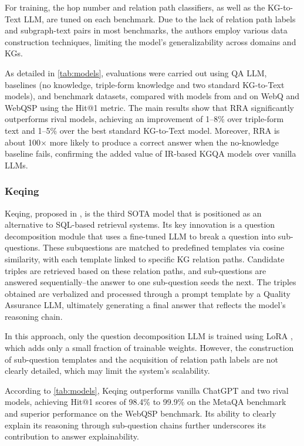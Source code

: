 \documentclass[pdflatex,sn-mathphys-num]{sn-jnl}%
\theoremstyle{thmstyleone}%
\theoremstyle{thmstyletwo}%
\theoremstyle{thmstylethree}%
\begin{document}
For training, the hop number and relation path classifiers, as well as the KG-to-Text LLM, are tuned on each benchmark. Due to the lack of relation path labels and subgraph-text pairs in most benchmarks, the authors employ various data construction techniques, limiting the model’s generalizability across domains and KGs.

As detailed in \autoref{tab:models}, evaluations were carried out using QA LLM, baselines (no knowledge, triple-form knowledge and two standard KG-to-Text models), and benchmark datasets, compared with models from \cite{Baek2023} and \cite{Sen2023} on WebQ \cite{Berant2013} and WebQSP \cite{Yih2016} using the Hit@1 metric. The main results show that RRA significantly outperforms rival models, achieving an improvement of 1–8\% over triple-form text and 1–5\% over the best standard KG-to-Text model. Moreover, RRA is about 100$\times$ more likely to produce a correct answer when the no-knowledge baseline fails, confirming the added value of IR-based KGQA models over vanilla LLMs.

\subsubsection{Keqing}
\label{sec:keqing}

Keqing, proposed in \cite{Wang2023}, is the third SOTA model that is positioned as an alternative to SQL-based retrieval systems. Its key innovation is a question decomposition module that uses a fine-tuned LLM to break a question into sub-questions. These subquestions are matched to predefined templates via cosine similarity, with each template linked to specific KG relation paths. Candidate triples are retrieved based on these relation paths, and sub-questions are answered sequentially--the answer to one sub-question seeds the next. The triples obtained are verbalized and processed through a prompt template by a Quality Assurance LLM, ultimately generating a final answer that reflects the model’s reasoning chain.

In this approach, only the question decomposition LLM is trained using LoRA \cite{Shen2021}, which adds only a small fraction of trainable weights. However, the construction of sub-question templates and the acquisition of relation path labels are not clearly detailed, which may limit the system's scalability.

According to \autoref{tab:models}, Keqing outperforms vanilla ChatGPT and two rival models, achieving Hit@1 scores of 98.4\% to 99.9\% on the MetaQA benchmark and superior performance on the WebQSP benchmark. Its ability to clearly explain its reasoning through sub-question chains further underscores its contribution to answer explainability.
\end{document}
